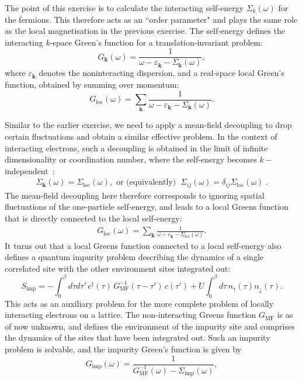 The point of this exercise is to calculate the interacting self-energy \(\Sigma_k(\omega)\) for the fermions. This therefore acts as an ``order parameter" and plays the same role as the local magnetisation in the previous exercise. The self-energy defines the interacting \(k\)-space Green's function for a translation-invariant problem:
\begin{equation}
	G_{\mathbf{k}}(\omega) = \frac{1}{\omega - \varepsilon_{\mathbf{k}} - \Sigma_{\mathbf{k}}(\omega)},
\end{equation}
where \(\varepsilon_{\mathbf{k}}\) denotes the noninteracting dispersion, and a real-space local Green's function, obtained by summing over momentum:
\begin{equation}\label{eq:localG}
G_{\text{loc}}(\omega) = \sum_{\mathbf{k}} \frac{1}{\omega - \varepsilon_{\mathbf{k}} - \Sigma_{\mathbf{k}}(\omega)}.
\end{equation}

Similar to the earlier exercise, we need to apply a mean-field decoupling to drop certain fluctuations and obtain a similar effective problem. In the context of interacting electrons, such a decoupling is obtained in the limit of infinite dimensionality or coordination number, where the self-energy becomes \(k-\)independent~\cite{metzner_volhardt_1989}:
\begin{equation}\begin{aligned}
	\Sigma_{\mathbf{k}}(\omega) = \Sigma_\text{loc}(\omega), \text{ or (equivalently) }~ \Sigma_{ij}(\omega) = \delta_{ij}\Sigma_\text{loc}(\omega)~.
\end{aligned}\end{equation}
The mean-field decoupling here therefore corresponds to ignoring spatial fluctuations of the one-particle self-energy, and leads to a local Greens function that is directly connected to the local self-energy:
\begin{equation}\begin{aligned}
G_{\text{loc}}(\omega) = \sum_{\mathbf{k}} \frac{1}{\omega - \varepsilon_{\mathbf{k}} - \Sigma_\text{loc}(\omega)}.
\end{aligned}\end{equation}
It turns out that a local Greens function connected to a local self-energy also defines a quantum impurity problem describing the dynamics of a single correlated site with the other environment sites integrated out:
\begin{equation}\label{effAction}
	S_{\text{imp}} = -\int_0^\beta d\tau d\tau'\,c^\dagger(\tau)\,G_\text{MF}^{-1}(\tau-\tau')\,c(\tau') + U \int_0^\beta d\tau\, n_\uparrow(\tau) n_\downarrow(\tau).
\end{equation}
This acts as an auxiliary problem for the more complete problem of locally interacting electrons on a lattice. The non-interacting Greens function \(G_\text{MF}\) is as of now unknown, and defines the environment of the impurity site and comprises the dynamics of the sites that have been integrated out. Such an impurity problem is solvable, and the impurity Green's function is given by
\begin{equation}
	G_{\text{imp}}(\omega) = \frac{1}{G_\text{MF}^{-1}(\omega) - \Sigma_\text{imp}(\omega)},
\end{equation}

